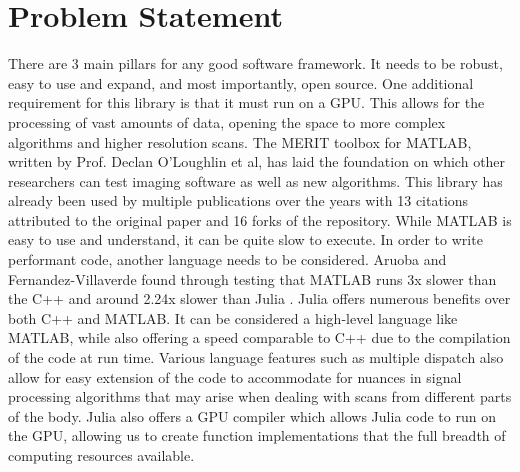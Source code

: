 \section*{Problem Statement}
There are 3 main pillars for any good software framework. It needs to be robust, easy to use and expand, and most importantly, open source. One additional requirement for this library is that it must run on a GPU. This allows for the processing of vast amounts of data, opening the space to more complex algorithms and higher resolution scans. The MERIT toolbox for MATLAB, written by Prof. Declan O'Loughlin et al, has laid the foundation on which other researchers can test imaging software as well as new algorithms. This library has already been used by multiple publications over the years with 13 citations attributed to the original paper and 16 forks of the repository. While MATLAB is easy to use and understand, it can be quite slow to execute. In order to write performant code, another language needs to be considered. Aruoba and Fernandez-Villaverde found through testing that MATLAB runs 3x slower than the C++ and around 2.24x slower than Julia \cite{RN3}. Julia offers numerous benefits over both C++ and MATLAB. It can be considered a high-level language like MATLAB, while also offering a speed comparable to C++ due to the compilation of the code at run time. Various language features such as multiple dispatch also allow for easy extension of the code to accommodate for nuances in signal processing algorithms that may arise when dealing with scans from different parts of the body. Julia also offers a GPU compiler which allows Julia code to run on the GPU, allowing us to create function implementations that the full breadth of computing resources available.